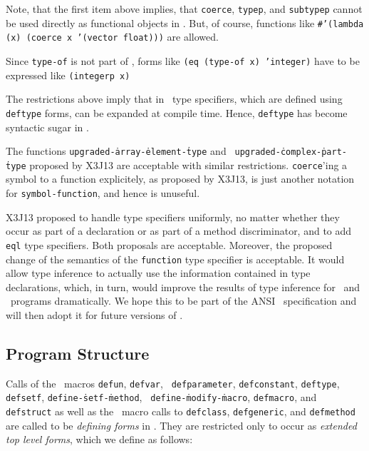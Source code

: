 Note, that the first item above implies, that {\tt coerce}, {\tt typep}, 
and {\tt subtypep} cannot be used directly as functional objects in . 
But, of course, functions like {\tt \#'(lambda (x) (coerce x '(vector 
float)))} are allowed. 

Since {\tt type-of} is not part of , forms like {\tt (eq (type-of
  x) 'integer)} have to be expressed like {\tt (integerp x)}

The restrictions above imply that in \ type specifiers, which are 
defined using {\tt deftype} forms, can be expanded at 
compile time. Hence, {\tt deftype} has become syntactic sugar in .

The functions {\tt upgraded-\.array-\.element-\.type} and {\tt
upgraded-\.complex-\.part-\.type} proposed by X3J13 are acceptable
with similar restrictions. {\tt coerce}'ing a symbol to a function
explicitely, as proposed by X3J13, is just another notation
for {\tt symbol-function}, and hence is unuseful.

X3J13 proposed to handle type specifiers uniformly, no matter whether they 
occur as part of a declaration or as part of a method discriminator, and to 
add {\tt eql} type specifiers. Both proposals are acceptable. Moreover, the 
proposed change of the semantics of the {\tt function} type specifier is 
acceptable. It would allow type inference to actually use the information 
contained in type declarations, which, in turn, would improve the results 
of type inference for \CL\ and \ programs dramatically. We hope this to 
be part of the ANSI \CL\ specification and will then adopt it for future 
versions of .

\subsection{Program Structure}
\label{progstructure}

Calls of the \CL\ macros {\tt defun}, {\tt defvar}, {\tt
  def\-para\-meter}, {\tt def\-constant}, {\tt def\-type}, {\tt
  def\-setf}, {\tt define-\.setf-\.method}, {\tt
  define-\.modify-\.macro}, {\tt defmacro}, and {\tt defstruct} as
well as the \ macro calls to {\tt defclass}, {\tt defgeneric},
and {\tt defmethod} are called to be {\em defining forms} in .
They are restricted only to occur as {\em extended top level forms},
which we define as follows:


